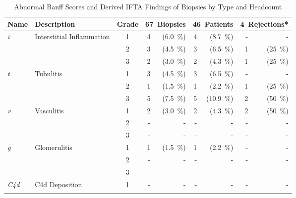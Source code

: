 
\begin{table}[tbp]
    \centering
    \caption{Abnormal Banff Scores and Derived IFTA Findings of Biopsies by Type and Headcount}
    {\fontsize{10}{10}\selectfont
    \begin{tabular}{ll c rr rr rr}
        \toprule
        Name & 
        Description & 
        Grade & 
        \multicolumn{2}{c}{67~Biopsies} & 
        \multicolumn{2}{c}{46~Patients} & 
        \multicolumn{2}{c}{4~Rejections*} \\\midrule
        \multirow{3}{0.5in}{\emph{i}} & 
        \multirow{3}{1.5in}{Interstitial Inflammation} & 
        1 & %
        4 & (6.0~\%) & 4 & (8.7~\%) & - & - 
        \\ & & 
        2 & %
        3 & (4.5~\%) & 3 & (6.5~\%) & 1 & (25~\%)
        \\ & & 
        3 & %
        2 & (3.0~\%) & 2 & (4.3~\%) & 1 & (25~\%)
        \\\hline
        \multirow{3}{0.5in}{\emph{t}} & 
        \multirow{3}{1.5in}{Tubulitis} & 
        1 & %
        3 & (4.5~\%) & 3 & (6.5~\%) & - & - 
        \\ & & 
        2 & %
        1 & (1.5~\%) & 1 & (2.2~\%) & 1 & (25~\%)
        \\ & & 
        3 & %
        5 & (7.5~\%) & 5 & (10.9~\%) & 2 & (50~\%)
        \\\hline
        \multirow{3}{0.5in}{\emph{v}} & 
        \multirow{3}{1.5in}{Vasculitis} & 
        1 & %
        2 & (3.0~\%) & 2 & (4.3~\%) & 2 & (50~\%)
        \\ & & 
        2 & %
        - & - & - & - & - & - 
        \\ & & 
        3 & %
        - & - & - & - & - & - 
        \\\hline
        \multirow{3}{0.5in}{\emph{g}} & 
        \multirow{3}{1.5in}{Glomerulitis} & 
        1 & %
        1 & (1.5~\%) & 1 & (2.2~\%) & - & - 
        \\ & & 
        2 & %
        - & - & - & - & - & - 
        \\ & & 
        3 & %
        - & - & - & - & - & - 
        \\\hline
        \multirow{3}{0.5in}{\emph{C4d}} & 
        \multirow{3}{1.5in}{C4d Deposition} & 
        1 & %
        - & - & - & - & - & - 
        \\ & & 

\end{tabular}}
\end{table}
